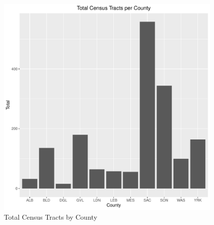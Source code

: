 \documentclass{article}\usepackage[]{graphicx}\usepackage[]{color}
\makeatletter
\def\maxwidth{ %
  \ifdim\Gin@nat@width>\linewidth
    \linewidth
  \else
    \Gin@nat@width
  \fi
}
\newenvironment{knitrout}{}{} %
\makeatother
\begin{document}
\begin{knitrout}
\color{fgcolor}\begin{figure}
\includegraphics[width=\maxwidth]{figure/Bar_All_Counties_Tract-1} \caption[Total Census Tracts by County]{Total Census Tracts by County}\label{fig:Bar_All_Counties_Tract}
\end{figure}


\end{knitrout}
\end{document}
